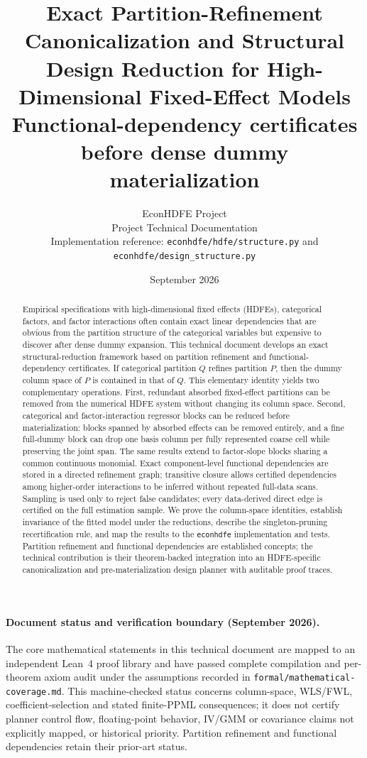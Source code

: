 \documentclass[11pt]{article}
\title{\textbf{Exact Partition-Refinement Canonicalization and Structural Design Reduction for High-Dimensional Fixed-Effect Models}\\
\large Functional-dependency certificates before dense dummy materialization}
\author{EconHDFE Project\\[2pt]\small Project Technical Documentation\\[2pt]\small Implementation reference: \texttt{econhdfe/hdfe/structure.py} and \texttt{econhdfe/design\_structure.py}}
\date{September 2026}
\theoremstyle{definition}
\newcommand{\1}{\mathbf{1}}
\begin{document}
\maketitle

\begin{abstract}
Empirical specifications with high-dimensional fixed effects (HDFEs), categorical factors, and factor interactions often contain exact linear dependencies that are obvious from the partition structure of the categorical variables but expensive to discover after dense dummy expansion. This technical document develops an exact structural-reduction framework based on partition refinement and functional-dependency certificates. If categorical partition $Q$ refines partition $P$, then the dummy column space of $P$ is contained in that of $Q$. This elementary identity yields two complementary operations. First, redundant absorbed fixed-effect partitions can be removed from the numerical HDFE system without changing its column space. Second, categorical and factor-interaction regressor blocks can be reduced before materialization: blocks spanned by absorbed effects can be removed entirely, and a fine full-dummy block can drop one basis column per fully represented coarse cell while preserving the joint span. The same results extend to factor-slope blocks sharing a common continuous monomial. Exact component-level functional dependencies are stored in a directed refinement graph; transitive closure allows certified dependencies among higher-order interactions to be inferred without repeated full-data scans. Sampling is used only to reject false candidates; every data-derived direct edge is certified on the full estimation sample. We prove the column-space identities, establish invariance of the fitted model under the reductions, describe the singleton-pruning recertification rule, and map the results to the \texttt{econhdfe} implementation and tests. Partition refinement and functional dependencies are established concepts; the technical contribution is their theorem-backed integration into an HDFE-specific canonicalization and pre-materialization design planner with auditable proof traces.
\end{abstract}

\paragraph{Document status and verification boundary (September 2026).}
The core mathematical statements in this technical document are mapped to an independent
Lean~4 proof library and have passed complete compilation and per-theorem axiom
audit under the assumptions recorded in
\texttt{formal/mathematical-coverage.md}. This machine-checked status concerns
column-space, WLS/FWL, coefficient-selection and stated finite-PPML consequences;
it does not certify planner control flow, floating-point behavior, IV/GMM or
covariance claims not explicitly mapped, or historical priority. Partition
refinement and functional dependencies retain their prior-art status.
\end{document}
